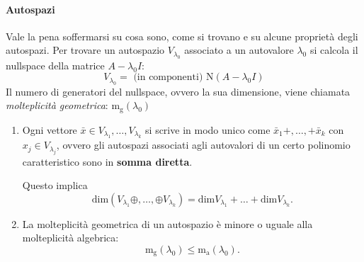 \documentclass[x11names]{article}
\begin{document}
\paragraph{Autospazi} Vale la pena soffermarsi su cosa sono, come si trovano e su alcune proprietà degli autospazi.
Per trovare un autospazio $V_{\lambda_{0}}$ associato a un autovalore $\lambda_{0}$ si calcola il nullspace della matrice $A-\lambda_{0} I$:
 \[
	 V_{\lambda_{0}} = \text{ (in componenti) } \text{N}\left(A-\lambda_{0} I\right)
\]
\noindent 
Il numero di generatori del nullspace, ovvero la sua dimensione, viene chiamata \textit{molteplicità geometrica}: $\text{m}_{\text{g}}\left(\lambda_{0}\right)$

\begin{enumerate}
		\item Ogni vettore $\bar{x} \in V_{\lambda_{1}},\dots,V_{\lambda_{k}}$ si scrive in modo unico come $\bar{x}_{1} +, \dots,+ \bar{x}_{k}$ con $x_{j} \in V_{\lambda_{j}}$, ovvero gli autospazi associati agli autovalori di un certo polinomio caratteristico sono in \textbf{somma diretta}.

		\noindent
Questo implica 
\[
\text{dim}\left(V_{\lambda_{1}}\oplus,\dots,\oplus V_{\lambda_{k}}\right) = \text{dim}V_{\lambda_{1}} + \dots + \text{dim}V_{\lambda_{k}}
.\] 
\item La molteplicità geometrica di un autospazio è minore o uguale alla molteplicità algebrica:
	\[
	\text{m}_{\text{g}}\left(\lambda_{0}\right) \leq \text{m}_{\text{a}}\left(\lambda_{0}\right)
	.\] 
\end{enumerate}
\end{document}
